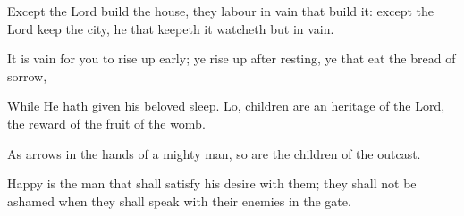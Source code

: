 Except the Lord build the house, they labour in vain that build it: except the Lord keep the city, he that keepeth it watcheth but in vain.

It is vain for you to rise up early; ye rise up after resting, ye that eat the bread of sorrow,

While He hath given his beloved sleep. Lo, children are an heritage of the Lord, the reward of the fruit of the womb.

As arrows in the hands of a mighty man, so are the children of the outcast.

Happy is the man that shall satisfy his desire with them; they shall not be ashamed when they shall speak with their enemies in the gate.
